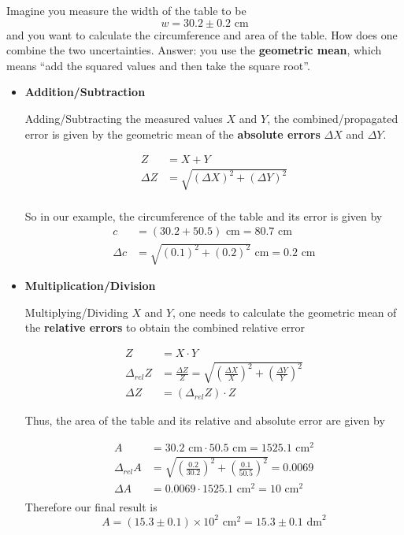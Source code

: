 \documentclass[a4paper,10pt]{article}
\begin{document}
Imagine you measure the width of the table to be 
\[
 w = 30.2 \pm 0.2 \text{ cm}
\]
and you want to calculate the circumference and area of the table. How does one combine the two uncertainties. Answer: you use the 
\textbf{geometric mean}, which means ``add the squared values and then take the square root''. 
\begin{itemize} 
 \item \textbf{Addition/Subtraction}
 
 Adding/Subtracting the measured values $X$ and $Y$, the combined/propagated error 
 is given by the geometric mean of the \textbf{absolute errors} $\Delta X$ and $\Delta Y$.
 
 \begin{align*}
  Z &= X+Y \\
  \Delta Z &= \sqrt{(\Delta X)^2 + (\Delta Y)^2} \\  
 \end{align*}
 
 So in our example, the circumference of the table and its error is given by
 \begin{align*}
  c &= (30.2 + 50.5) \text{ cm} = 80.7 \text{ cm} \\
  \Delta c &= \sqrt{(0.1)^2+(0.2)^2} \text{ cm}= 0.2 \text{ cm}
 \end{align*}

  \item \textbf{Multiplication/Division}
  
  Multiplying/Dividing $X$ and $Y$, one needs to calculate the geometric mean of the \textbf{relative errors} to obtain the 
  combined relative error
  
  \begin{align*}
  Z &= X \cdot Y \\
  \Delta_{rel} Z &= \frac{\Delta Z}{Z} = \sqrt{\left(\frac{\Delta X}{X}\right)^2 + \left(\frac{\Delta Y}{Y}\right)^2} \\  
  \Delta Z &= (\Delta_{rel}Z) \cdot Z
  \end{align*}
  
  Thus, the area of the table and its relative and absolute error are given by
  
  \begin{align*}
  A &=  30.2 \text{ cm}  \cdot 50.5 \text{ cm} = 1525.1 \text{ cm}^2 \\
  \Delta_{rel} A &= \sqrt{\left(\frac{0.2}{30.2}\right)^2 + \left(\frac{0.1}{50.5}\right)^2} = 0.0069 \\ 
  \Delta A &= 0.0069 \cdot 1525.1 \text{ cm} ^2 = 10 \text{ cm} ^2   \\
  \end{align*}
  Therefore our final result is 
  \[
   A = (15.3 \pm 0.1) \times 10^{2} \text{ cm}^2 = 15.3 \pm 0.1 \text{ dm}^2
  \]
  

\end{itemize}
\end{document}
